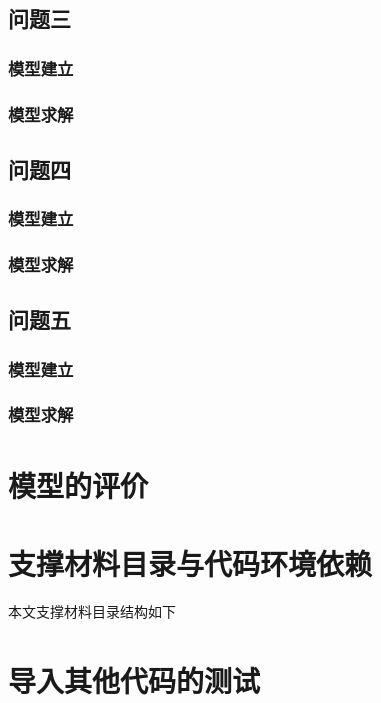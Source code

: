 \documentclass{../../Template/cumcmthesis} %
\begin{document}
\subsection{问题三}
  \subsubsection{模型建立}
    
  \subsubsection{模型求解}
    
    \subsection{问题四}
    \subsubsection{模型建立}
    
    \subsubsection{模型求解}
    
    \subsection{问题五}
    \subsubsection{模型建立}
    
    \subsubsection{模型求解}
    
     
\section{模型的评价}
  


\newpage
\nocite{*}



\newpage
\begin{appendices} %
  \section{支撑材料目录与代码环境依赖}
    本文支撑材料目录结构如下
    

  \section{导入其他代码的测试}
  

\end{appendices}
\end{document}
